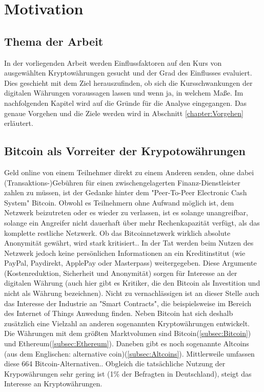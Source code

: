 \chapter{Motivation}

\section{Thema der Arbeit}
In der vorliegenden Arbeit werden Einflussfaktoren auf den Kurs von ausgewählten Kryptowährungen gesucht und der Grad des Einflusses evaluiert. Dies geschieht mit dem Ziel herauszufinden, ob sich die Kursschwankungen der digitalen Währungen voraussagen lassen und wenn ja, in welchem Maße. Im nachfolgenden Kapitel wird auf die Gründe für die Analyse eingegangen. Das genaue Vorgehen und die Ziele werden wird in Abschnitt \ref{chapter:Vorgehen} erläutert.

\section{Bitcoin als Vorreiter der Krypotowährungen}
Geld online von einem Teilnehmer direkt zu einem Anderen senden, ohne dabei (Transaktions-)Gebühren für einen zwischengelagerten Finanz-Dienstleister zahlen zu müssen, ist der Gedanke hinter dem "Peer-To-Peer Electronic Cash System"\citep{nakamoto_bitcoin:_2008} Bitcoin. Obwohl es Teilnehmern ohne Aufwand möglich ist, dem Netzwerk beizutreten oder es wieder zu verlassen, ist es solange unangreifbar, solange ein Angreifer nicht dauerhaft über mehr Rechenkapazität verfügt, als das komplette restliche Netzwerk.\citep{nakamoto_bitcoin:_2008} Ob das Bitcoinnetzwerk wirklich absolute Anonymität gewährt, wird stark kritisiert.\citep{reid_analysis_2013,androulaki_evaluating_2013}. In der Tat werden beim Nutzen des Netzwerk jedoch keine persönlichen Informationen an ein Kreditinstitut (wie PayPal, Paydirekt, ApplePay oder Masterpass) weitergegeben. Diese Argumente (Kostenreduktion, Sicherheit und Anonymität) sorgen für Interesse an der digitalen Währung (auch hier gibt es Kritiker, die den Bitcoin als Investition und nicht als Währung bezeichnen)\citep{baur_bitcoin:_2015}. Nicht zu vernachlässigen ist an dieser Stelle auch das Interesse der Industrie an "Smart Contracts", die beispielsweise im Bereich des Internet of Things Anwedung finden.\citep{christidis_blockchains_2016}\newline
Neben Bitcoin hat sich deshalb zusätzlich eine Vielzahl an anderen sogenannten Kryptowährungen entwickelt. Die Währungen mit dem größten Marktvolumen sind  Bitcoin(\ref{subsec:Bitcoin}) und Ethereum(\ref{subsec:Ethereum})\citep{wood_ethereum:_2014}.\citep{brandt_infografik:_2017, coinmarketcap_ranking_2017} Daneben gibt es noch sogenannte Altcoins (aus dem Englischen: alternative coin\citep{prableen_bajpai_altcoin_2014})(\ref{subsec:Altcoins}). Mittlerweile umfassen diese 664 Bitcoin-Alternativen.\citep{coindesk_anzahl_2017}. Obgleich die tatsächliche Nutzung der Krypowährungen sehr gering ist (1\% der Befragten in Deutschland\citep{tsys_kennen_2016}), steigt das Interesse an Kryptowährungen\citep{wikitrends_compare_2017,googletrends_googletrends_2017}.\newline
{}


